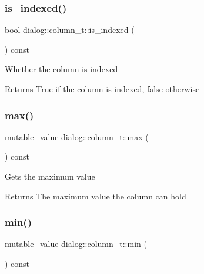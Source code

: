 \subsubsection{\texorpdfstring{is\+\_\+indexed()}{is\_indexed()}}
{\footnotesize\ttfamily bool dialog\+::column\+\_\+t\+::is\+\_\+indexed (\begin{DoxyParamCaption}{ }\end{DoxyParamCaption}) const\hspace{0.3cm}{\ttfamily [inline]}}

Whether the column is indexed \begin{DoxyReturn}{Returns}
True if the column is indexed, false otherwise 
\end{DoxyReturn}
\mbox{\label{classdialog_1_1column__t_a1588992ac054925f217f41a0de488896}} 
\subsubsection{\texorpdfstring{max()}{max()}}
{\footnotesize\ttfamily \hyperlink{classdialog_1_1mutable__value}{mutable\+\_\+value} dialog\+::column\+\_\+t\+::max (\begin{DoxyParamCaption}{ }\end{DoxyParamCaption}) const\hspace{0.3cm}{\ttfamily [inline]}}

Gets the maximum value \begin{DoxyReturn}{Returns}
The maximum value the column can hold 
\end{DoxyReturn}
\mbox{\label{classdialog_1_1column__t_a2c391fd127a2cdfbb5304c618f81b0b7}} 
\subsubsection{\texorpdfstring{min()}{min()}}
{\footnotesize\ttfamily \hyperlink{classdialog_1_1mutable__value}{mutable\+\_\+value} dialog\+::column\+\_\+t\+::min (\begin{DoxyParamCaption}{ }\end{DoxyParamCaption}) const\hspace{0.3cm}{\ttfamily [inline]}}

